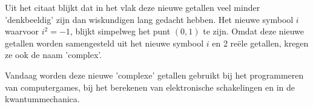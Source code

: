 \documentclass{ximera}
\begin{document}
    

Uit het citaat blijkt dat in het vlak deze nieuwe getallen veel minder 'denkbeeldig' zijn dan wiskundigen lang gedacht hebben. Het nieuwe symbool \(i\) waarvoor \(i^2 = -1\),  blijkt simpelweg het punt \((0,1)\) te zijn. Omdat deze nieuwe getallen worden samengesteld uit het nieuwe symbool \(i\) en 2 reële getallen, kregen ze ook de naam 'complex'. 

Vandaag worden deze nieuwe 'complexe' getallen gebruikt bij het programmeren van computergames, bij het berekenen van elektronische schakelingen en in de kwantummechanica.
\end{document}
